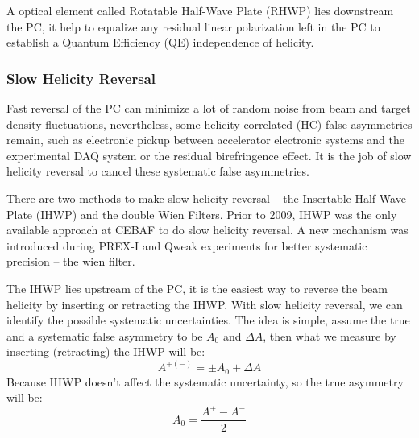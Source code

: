 A optical element called Rotatable Half-Wave Plate (RHWP) lies downstream the PC,
it help to equalize any residual linear polarization left in the PC to establish 
a Quantum Efficiency (QE) independence of helicity.

\subsubsection{Slow Helicity Reversal}
Fast reversal of the PC can minimize a lot of random noise from beam and target
density fluctuations, nevertheless, some helicity correlated (HC) false asymmetries
remain, such as electronic pickup between accelerator electronic systems and 
the experimental DAQ system or the residual birefringence effect. It is the 
job of slow helicity reversal to cancel these systematic false asymmetries.

There are two methods to make slow helicity reversal -- the Insertable Half-Wave Plate (IHWP) 
and the double Wien Filters. Prior to 2009, IHWP was the only available approach
at CEBAF to do slow helicity reversal. A new mechanism was introduced during 
PREX-I and Qweak experiments for better systematic precision -- the wien filter.

The IHWP lies upstream of the PC, it is the easiest way to reverse the beam 
helicity by inserting or retracting the IHWP. With slow helicity reversal, we 
can identify the possible systematic uncertainties. The idea
is simple, assume the true and a systematic false asymmetry to be $A_0$ and $\Delta A$,
then what we measure by inserting (retracting) the IHWP will be:
\begin{equation}
    A^{+(-)} = \pm A_0  + \Delta A
\end{equation}
Because IHWP doesn't affect the systematic uncertainty, so the true asymmetry
will be:
\begin{equation}
    A_0 = \frac{A^+ - A^-}{2}
\end{equation}


